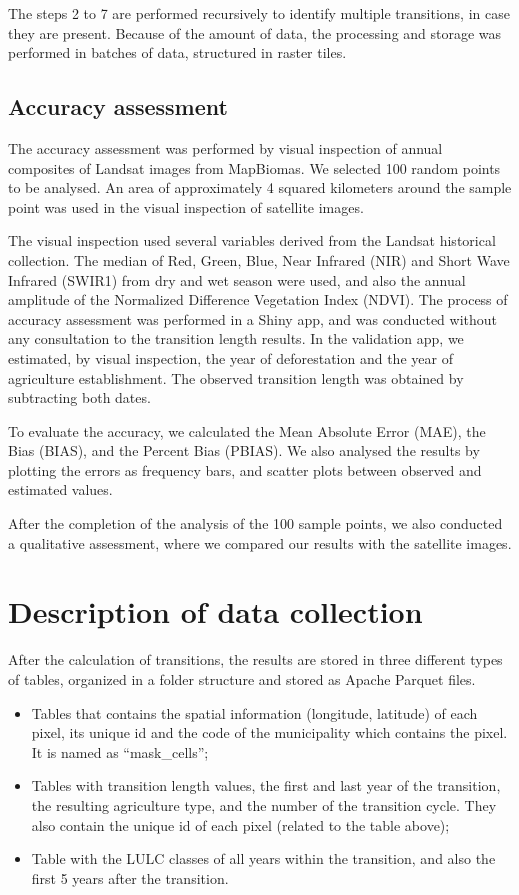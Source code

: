 \documentclass[essd, manuscript]{copernicus}
\begin{document}
The steps 2 to 7 are performed recursively to identify multiple transitions, in case they are present.
Because of the amount of data, the processing and storage was performed in batches of data, structured in raster tiles.

\subsection{Accuracy assessment}

The accuracy assessment was performed by visual inspection of annual composites of Landsat images from MapBiomas.
We selected 100 random points to be analysed.
An area of approximately 4 squared kilometers around the sample point was used in the visual inspection of satellite images.

The visual inspection used several variables derived from the Landsat historical collection.
The median of Red, Green, Blue, Near Infrared (NIR) and Short Wave Infrared (SWIR1) from dry and wet season were used, and also the annual amplitude of the Normalized Difference Vegetation Index (NDVI).
The process of accuracy assessment was performed in a Shiny app, and was conducted without any consultation to the transition length results.
In the validation app, we estimated, by visual inspection, the year of deforestation and the year of agriculture establishment.
The observed transition length was obtained by subtracting both dates.

To evaluate the accuracy, we calculated the Mean Absolute Error (MAE), the Bias (BIAS), and the Percent Bias (PBIAS).
We also analysed the results by plotting the errors as frequency bars, and scatter plots between observed and estimated values.

After the completion of the analysis of the 100 sample points, we also conducted a qualitative assessment, where we compared our results with the satellite images.

\section{Description of data collection}

After the calculation of transitions, the results are stored in three different types of tables, organized in a folder structure and stored as Apache Parquet files.

\begin{itemize}
\item
  Tables that contains the spatial information (longitude, latitude) of each pixel, its unique id and the code of the municipality which contains the pixel.
  It is named as ``mask\_cells'';
\item
  Tables with transition length values, the first and last year of the transition, the resulting agriculture type, and the number of the transition cycle.
  They also contain the unique id of each pixel (related to the table above);
\item
  Table with the LULC classes of all years within the transition, and also the first 5 years after the transition.
\end{itemize}
\end{document}
